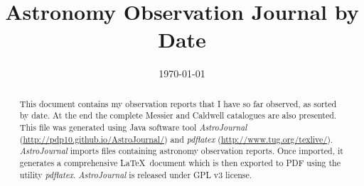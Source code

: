 \documentclass[10pt,twoside,a4paper,english]{article}
\title{Astronomy Observation Journal by Date}
\author{}
\date{\today}
\begin{document}
\maketitle
\thispagestyle{empty}

\begin{abstract}
This document contains my observation reports that I have so far observed, as sorted by date. At the end the complete Messier and Caldwell catalogues are also presented. This file was generated using Java software tool {\it AstroJournal} (\href{http://pdp10.github.io/AstroJournal/}{http://pdp10.github.io/AstroJournal/}) and {\it pdflatex} (\href{http://www.tug.org/texlive/}{http://www.tug.org/texlive/}). {\it AstroJournal} imports files containing astronomy observation reports. Once imported, it generates a comprehensive \LaTeX\ document which is then exported to PDF using the utility {\it pdflatex}. {\it AstroJournal} is released under GPL v3 license.
\end{abstract}


\tableofcontents

\clearpage
{}


\small

\clearpage


\normalsize
\end{document}
